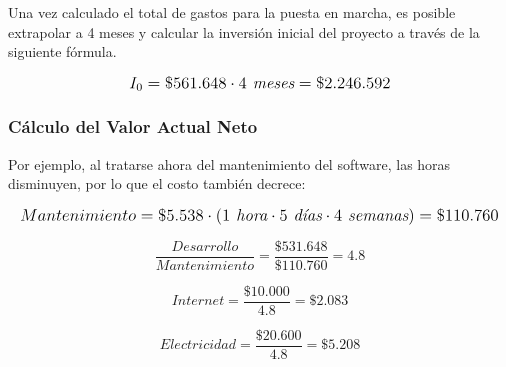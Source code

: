Una vez calculado el total de gastos para la puesta en marcha, es posible extrapolar a 4 meses y calcular la inversión inicial del proyecto a través de la siguiente fórmula.

\[
\mathlarger{
	{I_0} = \$561.648 \cdot 4\textit{ meses}= \$2.246.592
}
\]

\subsubsection{Cálculo del Valor Actual Neto}
Por ejemplo, al tratarse ahora del mantenimiento del software, las horas disminuyen, por lo que el costo también decrece:

\[
\mathlarger{
	Mantenimiento = \$5.538 \cdot \left(1 \textit{ hora}\cdot5 \textit{ días}\cdot4 \textit{ semanas}\right) = \$110.760
}
\]

\[
\frac{Desarrollo}{Mantenimiento} = \frac{\$531.648}{\$110.760} = 4.8
\]

\[
Internet = \frac{\$10.000}{4.8} = \$2.083
\]

\[
Electricidad = \frac{\$20.600}{4.8} = \$5.208
\]

